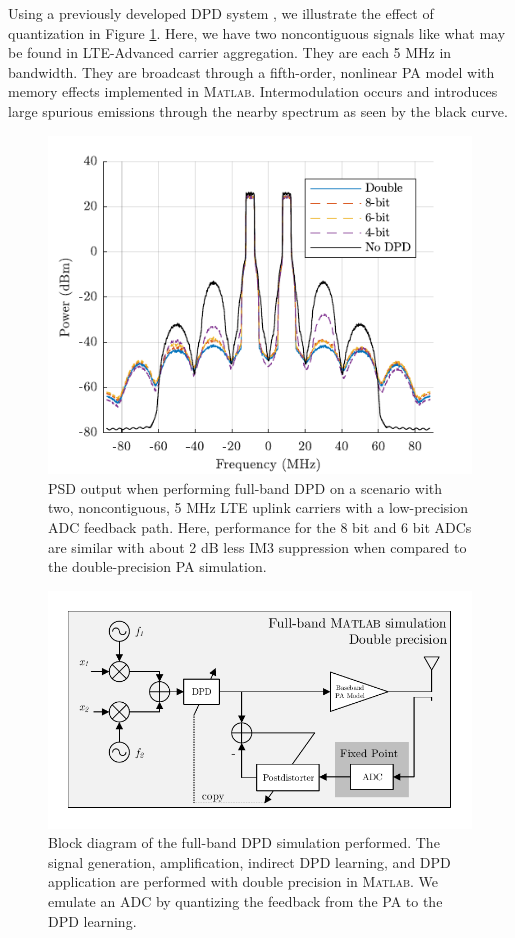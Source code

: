 \documentclass[conference]{IEEEtran}
\begin{document}
Using a previously developed DPD system \cite{Li2016GPU}, we illustrate the effect of quantization in Figure \ref{fullbandpsd}. 
Here, we have two noncontiguous signals like what may be found in LTE-Advanced carrier aggregation. They are each 5 MHz in bandwidth. 
They are broadcast through a fifth-order, nonlinear PA model with memory effects implemented in \textsc{Matlab}. 
Intermodulation occurs and introduces large spurious emissions through the nearby spectrum as seen by the black curve.

\begin{figure}[]
	\centering
	\includegraphics[]{FullBandPSD}
	\caption{PSD output when performing full-band DPD on a scenario with two, noncontiguous, 5 MHz LTE uplink carriers with a low-precision ADC feedback path. Here, performance for the 8 bit and 6 bit ADCs are similar with about 2 dB less IM3 suppression when compared to the double-precision PA simulation.}
	\label{fullbandpsd}
\end{figure}

\begin{figure}[]
	\centering
	\includegraphics[width=\columnwidth]{FullBandIndirect}
	\caption{Block diagram of the full-band DPD simulation performed. The signal generation, amplification, indirect DPD learning, and DPD application are performed with double precision in \textsc{Matlab}. We emulate an ADC by quantizing the feedback from the PA to the DPD learning.}
	\label{block}
\end{figure}
\end{document}
